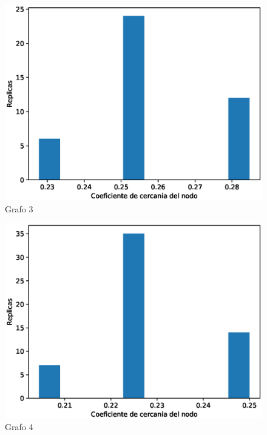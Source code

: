 \documentclass{article}
\begin{document}
\begin{figure}[H]
    \includegraphics[scale=0.6]{hist-agrupamiento-3}
    \caption{Grafo 3}
    \label{fig:matriz}
\end{figure}
\begin{figure}[H]
    \includegraphics[scale=0.6]{hist-agrupamiento-4}
    \caption{Grafo 4}
    \label{fig:matriz}
\end{figure}
\end{document}
